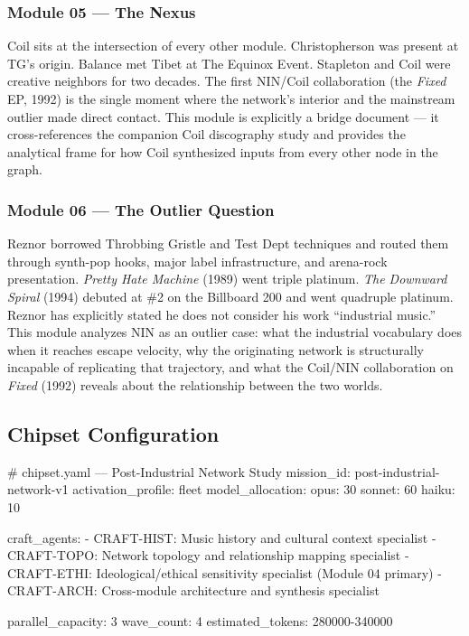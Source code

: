 \documentclass[11pt,letterpaper]{article}
\begin{document}
\subsubsection{Module 05 --- The Nexus}

Coil sits at the intersection of every other module. Christopherson was present at TG's origin.
Balance met Tibet at The Equinox Event. Stapleton and Coil were creative neighbors for two
decades. The first NIN/Coil collaboration (the \textit{Fixed} EP, 1992) is the single moment
where the network's interior and the mainstream outlier made direct contact. This module is
explicitly a bridge document — it cross-references the companion Coil discography study and
provides the analytical frame for how Coil synthesized inputs from every other node in the graph.

\subsubsection{Module 06 --- The Outlier Question}

Reznor borrowed Throbbing Gristle and Test Dept techniques and routed them through synth-pop
hooks, major label infrastructure, and arena-rock presentation. \textit{Pretty Hate Machine}
(1989) went triple platinum. \textit{The Downward Spiral} (1994) debuted at \#2 on the
Billboard 200 and went quadruple platinum. Reznor has explicitly stated he does not consider
his work ``industrial music.'' This module analyzes NIN as an outlier case: what the industrial
vocabulary does when it reaches escape velocity, why the originating network is structurally
incapable of replicating that trajectory, and what the Coil/NIN collaboration on \textit{Fixed}
(1992) reveals about the relationship between the two worlds.

\subsection{Chipset Configuration}

\begin{asciibox}
# chipset.yaml — Post-Industrial Network Study
mission_id: post-industrial-network-v1
activation_profile: fleet
model_allocation:
  opus: 30%
  sonnet: 60%
  haiku: 10%

craft_agents:
  - CRAFT-HIST: Music history and cultural context specialist
  - CRAFT-TOPO: Network topology and relationship mapping specialist
  - CRAFT-ETHI: Ideological/ethical sensitivity specialist (Module 04 primary)
  - CRAFT-ARCH: Cross-module architecture and synthesis specialist

parallel_capacity: 3
wave_count: 4
estimated_tokens: 280000-340000
\end{asciibox}
\end{document}
